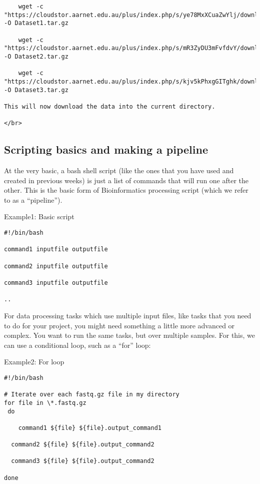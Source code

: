 \begin{verbatim}
    wget -c "https://cloudstor.aarnet.edu.au/plus/index.php/s/ye78MxXCuaZwYlj/download" -O Dataset1.tar.gz

    wget -c "https://cloudstor.aarnet.edu.au/plus/index.php/s/mR3ZyDU3mFvfdvY/download" -O Dataset2.tar.gz

    wget -c "https://cloudstor.aarnet.edu.au/plus/index.php/s/kjv5kPhxgGITghk/download" -O Dataset3.tar.gz

This will now download the data into the current directory.

</br>
\end{verbatim}

\subsection{Scripting basics and making a
pipeline}\label{scripting-basics-and-making-a-pipeline}

At the very basic, a bash shell script (like the ones that you have used
and created in previous weeks) is just a list of commands that will run
one after the other. This is the basic form of Bioinformatics processing
script (which we refer to as a ``pipeline'').

Example1: Basic script

\begin{verbatim}
#!/bin/bash

command1 inputfile outputfile

command2 inputfile outputfile

command3 inputfile outputfile

..
\end{verbatim}

For data processing tasks which use multiple input files, like tasks
that you need to do for your project, you might need something a little
more advanced or complex. You want to run the same tasks, but over
multiple samples. For this, we can use a conditional loop, such as a
``for'' loop:

Example2: For loop

\begin{verbatim}
#!/bin/bash

# Iterate over each fastq.gz file in my directory
for file in \*.fastq.gz
 do

    command1 ${file} ${file}.output_command1

  command2 ${file} ${file}.output_command2

  command3 ${file} ${file}.output_command2

done
\end{verbatim}

